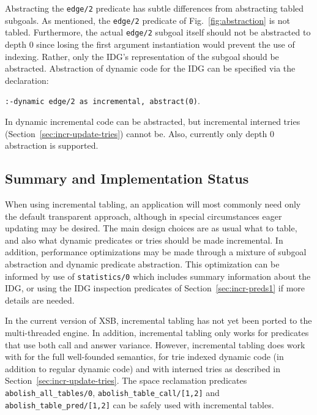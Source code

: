 Abstracting the {\tt edge/2} predicate has subtle differences from
abstracting tabled subgoals.
As mentioned, the {\tt edge/2} predicate of
Fig.~\ref{fig:abstraction} is not tabled.  Furthermore, the actual
{\tt edge/2} subgoal itself should not be abstracted to depth 0 since
losing the first argument instantiation would prevent the use of
indexing.  Rather, only the IDG's representation of the subgoal
should be abstracted.  Abstraction of dynamic code for
the IDG can be specified via the declaration:
\begin{center}
{\tt :-dynamic edge/2 as incremental, abstract(0)}.
\end{center}

In \version{} dynamic incremental code can be abstracted, but
incremental interned tries (Section~\ref{sec:incr-update-tries})
cannot be.  Also, currently only depth 0 abstraction is supported.

\subsection{Summary and Implementation Status}
%
When using incremental tabling, an application will most commonly need
only the default transparent approach, although in special
circumstances eager updating may be desired.  The main design choices
are as usual what to table, and also what dynamic predicates or tries
should be made incremental.  In addition, performance optimizations
may be made through a mixture of subgoal abstraction and dynamic
predicate abstraction.  This optimization can be informed by use of
{\tt statistics/0} which includes summary information about the IDG,
or using the IDG inspection predicates of
Section~\ref{sec:incr-preds1} if more details are needed.


In the current version of XSB, incremental tabling has not yet been
ported to the multi-threaded engine.  In addition, incremental tabling
only works for predicates that use both call and answer variance.
However, incremental tabling does work with for the full well-founded
semantics, for trie indexed dynamic code (in addition to regular
dynamic code) and with interned tries as described in
Section~\ref{sec:incr-update-tries}.  The space reclamation predicates
{\tt abolish\_all\_tables/0}, {\tt abolish\_table\_call/[1,2]} and
{\tt abolish\_table\_pred/[1,2]} can be safely used with incremental
tables.

